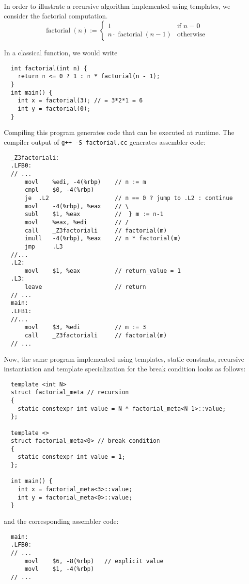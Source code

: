 In order to illustrate a recursive algorithm implemented using templates, we consider the factorial computation.
\[
  \operatorname{factorial}(n) := \left\{\begin{array}{ll} 1 & \text{if }n = 0 \\ n \cdot \operatorname{factorial}(n-1) & \text{otherwise} \end{array}\right.
\]

In a classical function, we would write
\begin{verbatim}
  int factorial(int n) {
    return n <= 0 ? 1 : n * factorial(n - 1);
  }
  int main() {
    int x = factorial(3); // = 3*2*1 = 6
    int y = factorial(0);
  }
\end{verbatim}
Compiling this program generates code that can be executed at runtime.
The compiler output of \texttt{g++ -S factorial.cc} generates assembler code:
\begin{verbatim}
  _Z3factoriali:
  .LFB0:
  // ...
      movl    %edi, -4(%rbp)    // n := m
      cmpl    $0, -4(%rbp)
      je  .L2                   // n == 0 ? jump to .L2 : continue
      movl    -4(%rbp), %eax    // \
      subl    $1, %eax          //  } m := n-1
      movl    %eax, %edi        // /
      call    _Z3factoriali     // factorial(m)
      imull   -4(%rbp), %eax    // n * factorial(m)
      jmp     .L3
  //...
  .L2:
      movl    $1, %eax          // return_value = 1
  .L3:
      leave                     // return
  // ...
  main:
  .LFB1:
  //...
      movl    $3, %edi          // m := 3
      call    _Z3factoriali     // factorial(m)
  // ...
\end{verbatim}

Now, the same program implemented using templates, static constants, recursive instantiation and template specialization for the break condition
looks as follows:
\begin{verbatim}
  template <int N>
  struct factorial_meta // recursion
  {
    static constexpr int value = N * factorial_meta<N-1>::value;
  };

  template <>
  struct factorial_meta<0> // break condition
  {
    static constexpr int value = 1;
  };

  int main() {
    int x = factorial_meta<3>::value;
    int y = factorial_meta<0>::value;
  }
\end{verbatim}
and the corresponding assembler code:

\begin{verbatim}
  main:
  .LFB0:
  // ...
      movl    $6, -8(%rbp)   // explicit value
      movl    $1, -4(%rbp)
  // ...
\end{verbatim}

